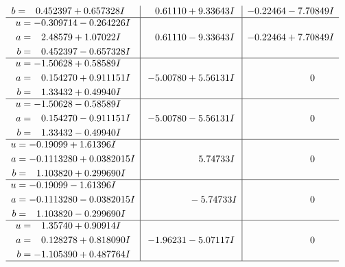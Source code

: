 \documentclass[1p]{elsarticle_modified}
\theoremstyle{definition}
\begin{document}
$$\begin{array}{c|c|c}
\begin{aligned}
b &= \phantom{-}0.452397 + 0.657328 I\end{aligned}
 & \phantom{-}0.61110 + 9.33643 I & -0.22464 - 7.70849 I \\ \hline\begin{aligned}
u &= -0.309714 - 0.264226 I \\
a &= \phantom{-}2.48579 + 1.07022 I \\
b &= \phantom{-}0.452397 - 0.657328 I\end{aligned}
 & \phantom{-}0.61110 - 9.33643 I & -0.22464 + 7.70849 I \\ \hline\begin{aligned}
u &= -1.50628 + 0.58589 I \\
a &= \phantom{-}0.154270 + 0.911151 I \\
b &= \phantom{-}1.33432 + 0.49940 I\end{aligned}
 & -5.00780 + 5.56131 I & \phantom{-0.000000 } 0 \\ \hline\begin{aligned}
u &= -1.50628 - 0.58589 I \\
a &= \phantom{-}0.154270 - 0.911151 I \\
b &= \phantom{-}1.33432 - 0.49940 I\end{aligned}
 & -5.00780 - 5.56131 I & \phantom{-0.000000 } 0 \\ \hline\begin{aligned}
u &= -0.19099 + 1.61396 I \\
a &= -0.1113280 + 0.0382015 I \\
b &= \phantom{-}1.103820 + 0.299690 I\end{aligned}
 & \phantom{-0.000000 -}5.74733 I & \phantom{-0.000000 } 0 \\ \hline\begin{aligned}
u &= -0.19099 - 1.61396 I \\
a &= -0.1113280 - 0.0382015 I \\
b &= \phantom{-}1.103820 - 0.299690 I\end{aligned}
 & \phantom{-0.000000 } -5.74733 I & \phantom{-0.000000 } 0 \\ \hline\begin{aligned}
u &= \phantom{-}1.35740 + 0.90914 I \\
a &= \phantom{-}0.128278 + 0.818090 I \\
b &= -1.105390 + 0.487764 I\end{aligned}
 & -1.96231 - 5.07117 I & \phantom{-0.000000 } 0\\
 \hline 
 \end{array}$$\newpage$$\begin{array}{c|c|c}  

\end{array}$$
\end{document}
